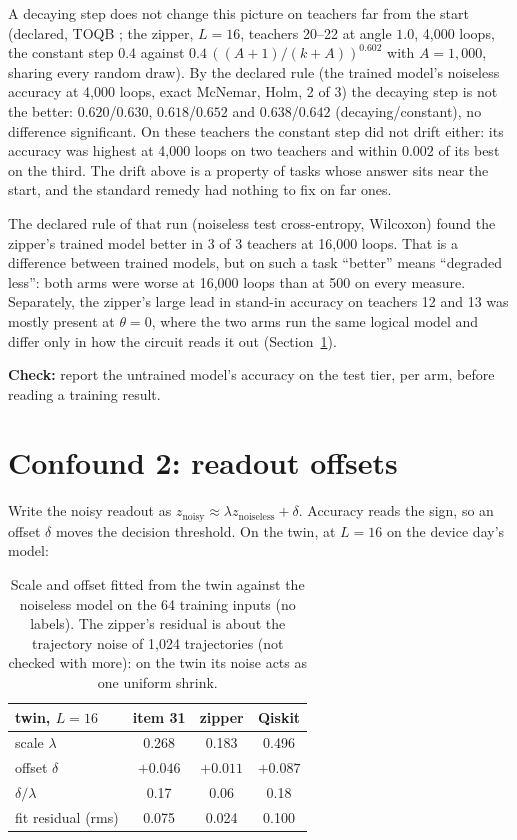\documentclass[11pt]{article}
\begin{document}
A decaying step does not change this picture on teachers far from the start (declared, TOQB
; the zipper, $L = 16$, teachers 20--22 at angle $1.0$, 4{,}000 loops,
the constant step $0.4$ against $0.4\,((A+1)/(k+A))^{0.602}$ with $A = 1{,}000$, sharing every random draw). By the
declared rule (the trained model's noiseless accuracy at 4{,}000 loops, exact McNemar, Holm, 2 of 3) the decaying step
is not the better: $0.620$/$0.630$, $0.618$/$0.652$ and $0.638$/$0.642$ (decaying/constant), no difference
significant. On these teachers the constant step did not drift either: its accuracy was highest at 4{,}000 loops on
two teachers and within $0.002$ of its best on the third. The drift above is a property of tasks whose answer sits
near the start, and the standard remedy had nothing to fix on far ones.

The declared rule of that run (noiseless test cross-entropy, Wilcoxon) found the zipper's trained model better in 3 of
3 teachers at 16{,}000 loops. That is a difference between trained models, but on such a task ``better'' means
``degraded less'': both arms were worse at 16{,}000 loops than at 500 on every measure. Separately, the zipper's
large lead in stand-in accuracy on teachers 12 and 13 was mostly present at $\theta = 0$, where the two arms run the
same logical model and differ only in how the circuit reads it out (Section~\ref{sec:offset}).

\textbf{Check:} report the untrained model's accuracy on the test tier, per arm, before reading a training result.

\section{Confound 2: readout offsets}
\label{sec:offset}

Write the noisy readout as $z_{\text{noisy}} \approx \lambda z_{\text{noiseless}} + \delta$. Accuracy reads the sign,
so an offset $\delta$ moves the decision threshold. On the twin, at $L = 16$ on the device day's model:

\begin{table}[h]
\centering
\small
\begin{tabular}{lccc}
\toprule
twin, $L = 16$ & item 31 & zipper & Qiskit \\
\midrule
scale $\lambda$ & 0.268 & 0.183 & 0.496 \\
offset $\delta$ & $+0.046$ & $+0.011$ & $+0.087$ \\
$\delta / \lambda$ & 0.17 & 0.06 & 0.18 \\
fit residual (rms) & 0.075 & 0.024 & 0.100 \\
\bottomrule
\end{tabular}
\caption{Scale and offset fitted from the twin against the noiseless model on the 64 training inputs (no labels).
The zipper's residual is about the trajectory noise of 1{,}024 trajectories (not checked with more): on the twin
its noise acts as one uniform shrink.}
\label{tab:lamdelta}
\end{table}
\end{document}

